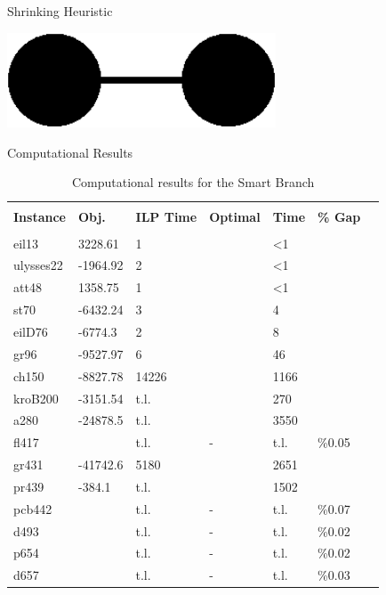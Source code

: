 \documentclass[10pt]{beamer}
\begin{document}
\begin{frame}{Shrinking Heuristic}
\begin{example}
    \begin{center}
            \includegraphics[width=8cm]{Shrinking13.eps} 
    \end{center}
\end{example}
\end{frame}


\begin{frame}{Computational Results}

\begin{table}
\begin{center}
\resizebox{.75\textwidth}{!}
{
\begin{tabular}{l l l l l l l}
\hline \\
\textbf{Instance}	&	\textbf{Obj.}	&	\textbf{ILP Time}	&	\textbf{Optimal}	&	\textbf{Time}	&	\textbf{\% Gap}	& \\
\hline \\
eil13		&	3228.61		&	1		&	\checkmark	&	<1		&			&	\\
ulysses22	&	-1964.92	&	2		&	\checkmark	&	<1		&			&	\\
att48		&	1358.75		&	1		&	\checkmark	&	<1		&			&	\\
st70		&	-6432.24	&	3		&	\checkmark	&	4		&			&	\\
eilD76		&	-6774.3		&	2		&	\checkmark	&	8		&			&	\\
gr96		&	-9527.97	&	6		&	\checkmark	&	46		&			&	\\
ch150		&	-8827.78	&	14226	&	\checkmark	&	1166	&			&	\\
kroB200		&	-3151.54	&	t.l.	&	\checkmark	&	270		&			&	\\
a280		&	-24878.5	&	t.l.	&	\checkmark	&	3550	&			&	\\
fl417		&				&	t.l.	&	-			&	t.l.	&	\%0.05	&	\\
gr431		&	-41742.6	&	5180	&	\checkmark	&	2651	&			&	\\
pr439		&	-384.1		&	t.l.	&	\checkmark	&	1502	&			&	\\
pcb442		&				&	t.l.	&	-			&	t.l.	&	\%0.07	&	\\
d493		&				&	t.l.	&	-			&	t.l.	&	\%0.02	&	\\
p654		&				&	t.l.	&	-			&	t.l.	&	\%0.02	&	\\
d657		&				&	t.l.	&	-			&	t.l.	&	\%0.03	&	\\
\hline
\end{tabular} }
\caption{Computational results for the \alert{Smart Branch}} \label{tbl:results3}
\end{center}
\end{table}
\end{frame}
\end{document}
